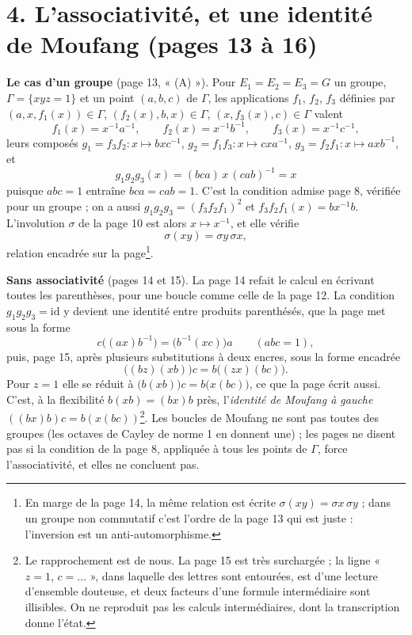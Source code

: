 \documentclass[11pt,a4paper]{article}
\begin{document}
\section*{4. L'associativité, et une identité de Moufang (pages 13 à 16)}

\textbf{Le cas d'un groupe} (page 13, « (A) »). Pour $E_1 = E_2 = E_3 = G$
un groupe, $\Gamma = \lbrace xyz = 1\rbrace$ et un point $(a, b, c)$ de $\Gamma$,
les applications $f_1$, $f_2$, $f_3$ définies par $(a, x, f_1(x)) \in \Gamma$,
$(f_2(x), b, x) \in \Gamma$, $(x, f_3(x), c) \in \Gamma$ valent
\[
f_1(x) = x^{-1}a^{-1}, \qquad f_2(x) = x^{-1}b^{-1}, \qquad f_3(x) =
x^{-1}c^{-1},
\]
leurs composés $g_1 = f_3 f_2 : x \mapsto b x c^{-1}$, $g_2 = f_1 f_3 : x \mapsto
c x a^{-1}$, $g_3 = f_2 f_1 : x \mapsto a x b^{-1}$, et
\[
g_1 g_2 g_3 (x) = (bca)\, x\, (cab)^{-1} = x
\]
puisque $abc = 1$ entraîne $bca = cab = 1$. C'est la condition admise page 8,
vérifiée pour un groupe ; on a aussi $g_1 g_2 g_3 = (f_3 f_2 f_1)^2$ et
$f_3f_2f_1(x) = b x^{-1} b$. L'involution $\sigma$ de la page 10 est alors $x
\mapsto x^{-1}$, et elle vérifie
\[
\sigma(xy) = \sigma y\, \sigma x,
\]
relation encadrée sur la page\footnote{En marge de la page 14, la même relation
est écrite $\sigma(xy) = \sigma x\, \sigma y$ ; dans un groupe non commutatif
c'est l'ordre de la page 13 qui est juste : l'inversion est un
anti-automorphisme.}.

\textbf{Sans associativité} (pages 14 et 15). La page 14 refait le calcul en
écrivant toutes les parenthèses, pour une boucle comme celle de la page 12. La
condition $g_1 g_2 g_3 = \mathrm{id}$ y devient une identité entre produits
parenthésés, que la page met sous la forme
\[
c\bigl((ax)b^{-1}\bigr) = \bigl(b^{-1}(xc)\bigr)a \qquad (abc = 1),
\]
puis, page 15, après plusieurs substitutions à deux encres, sous la forme
encadrée
\[
\bigl((bz)(xb)\bigr)c = b\bigl((zx)(bc)\bigr).
\]
Pour $z = 1$ elle se réduit à $\bigl(b(xb)\bigr)c = b\bigl(x(bc)\bigr)$, ce que
la page écrit aussi. C'est, à la flexibilité $b(xb) = (bx)b$ près, l'\emph{identité
de Moufang à gauche} $((bx)b)c = b(x(bc))$\footnote{Le rapprochement est de
nous. La page 15 est très surchargée ; la ligne « $z = 1$, $c = \ldots$ », dans
laquelle des lettres sont entourées, est d'une lecture d'ensemble douteuse, et
deux facteurs d'une formule intermédiaire sont illisibles. On ne reproduit pas
les calculs intermédiaires, dont la transcription donne l'état.}. Les boucles
de Moufang ne sont pas toutes des groupes (les octaves de Cayley de norme 1 en
donnent une) ; les pages ne disent pas si la condition de la page 8, appliquée
à tous les points de $\Gamma$, force l'associativité, et elles ne concluent
pas.
\end{document}
